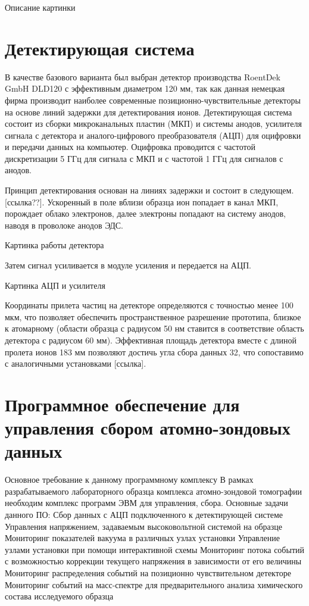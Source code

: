  Описание картинки

\FloatBarrier

\section{Детектирующая система}\label{sec:ch2/sec4}

В качестве базового варианта был выбран детектор производства RoentDek GmbH DLD120 с эффективным диаметром 120 мм, так как данная немецкая фирма производит наиболее современные позиционно-чувствительные детекторы на основе линий задержки для детектирования ионов. Детектирующая система состоит из сборки микроканальных пластин (МКП) и системы анодов, усилителя сигнала с детектора и аналого-цифрового преобразователя (АЦП) для оцифровки и передачи данных на компьютер. Оцифровка проводится с частотой дискретизации 5 ГГц для сигнала с МКП и с частотой 1 ГГц для сигналов с анодов. 

Принцип детектирования основан на линиях задержки и состоит в следующем. [ссылка??]. Ускоренный в поле вблизи образца ион попадает в канал МКП, порождает облако электронов, далее электроны попадают на систему анодов, наводя в проволоке анодов ЭДС. 

Картинка работы детектора

Затем сигнал усиливается в модуле усиления и передается на АЦП. 

Картинка АЦП и усилителя

Координаты прилета частиц на детекторе определяются с точностью менее 100 мкм, что позволяет обеспечить пространственное разрешение прототипа, близкое к атомарному (области образца с радиусом 50 нм ставится в соответствие область детектора с радиусом 60 мм). Эффективная площадь детектора вместе с длиной пролета ионов 183 мм позволяют достичь угла сбора данных 32, что сопоставимо с аналогичными установками [ссылка].

\FloatBarrier

\section{Программное обеспечение для управления сбором атомно-зондовых данных}\label{sec:ch2/sec5}

Основное требование к данному программному комплексу 
В рамках разрабатываемого лабораторного образца комплекса атомно-зондовой томографии необходим комплекс программ ЭВМ для управления, сбора.
Основные задачи данного ПО:
Сбор данных с АЦП подключенного к детектирующей системе
Управления напряжением, задаваемым высоковольтной системой на образце
Мониторинг показателей вакуума в различных узлах установки
Управление узлами установки при помощи интерактивной схемы
Мониторинг потока событий с возможностью коррекции текущего напряжения в зависимости от его величины
Мониторинг распределения событий на позиционно чувствительном детекторе
Мониторинг событий на масс-спектре для предварительного анализа химического состава исследуемого образца

